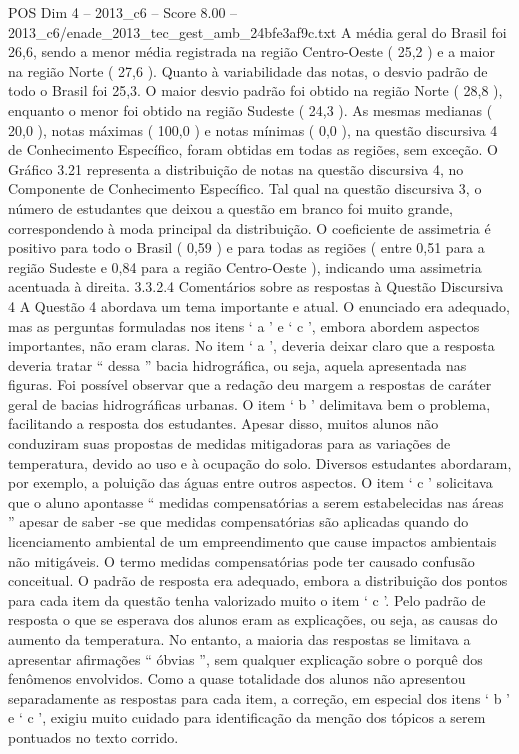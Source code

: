 \begin{textsample}{POS Dim 4 – 2013\_c6 – Score 8.00 – 2013\_c6/enade\_2013\_tec\_gest\_amb\_24bfe3af9c.txt}
A média geral do Brasil foi 26,6, sendo a menor média registrada na região Centro-Oeste ( 25,2 ) e a maior na região Norte ( 27,6 ).
Quanto à variabilidade das notas, o desvio padrão de todo o Brasil foi 25,3.
O maior desvio padrão foi obtido na região Norte ( 28,8 ), enquanto o menor foi obtido na região Sudeste ( 24,3 ).
As mesmas medianas ( 20,0 ), notas máximas ( 100,0 ) e notas mínimas ( 0,0 ), na questão discursiva 4 de Conhecimento Específico, foram obtidas em todas as regiões, sem exceção.
O Gráfico 3.21 representa a distribuição de notas na questão discursiva 4, no Componente de Conhecimento Específico.
Tal qual na questão discursiva 3, o número de estudantes que deixou a questão em branco foi muito grande, correspondendo à moda principal da distribuição.
O coeficiente de assimetria é positivo para todo o Brasil ( 0,59 ) e para todas as regiões ( entre 0,51 para a região Sudeste e 0,84 para a região Centro-Oeste ), indicando uma assimetria acentuada à direita. 3.3.2.4 Comentários sobre as respostas à Questão Discursiva 4 A Questão 4 abordava um tema importante e atual.
O enunciado era adequado, mas as perguntas formuladas nos itens ‘ a ’ e ‘ c ’, embora abordem aspectos importantes, não eram claras.
No item ‘ a ’, deveria deixar claro que a resposta deveria tratar “ dessa ” bacia hidrográfica, ou seja, aquela apresentada nas figuras.
Foi possível observar que a redação deu margem a respostas de caráter geral de bacias hidrográficas urbanas.
O item ‘ b ’ delimitava bem o problema, facilitando a resposta dos estudantes.
Apesar disso, muitos alunos não conduziram suas propostas de medidas mitigadoras para as variações de temperatura, devido ao uso e à ocupação do solo.
Diversos estudantes abordaram, por exemplo, a poluição das águas entre outros aspectos.
O item ‘ c ’ solicitava que o aluno apontasse “ medidas compensatórias a serem estabelecidas nas áreas ” apesar de saber -se que medidas compensatórias são aplicadas quando do licenciamento ambiental de um empreendimento que cause impactos ambientais não mitigáveis.
O termo medidas compensatórias pode ter causado confusão conceitual.
O padrão de resposta era adequado, embora a distribuição dos pontos para cada item da questão tenha valorizado muito o item ‘ c ’.
Pelo padrão de resposta o que se esperava dos alunos eram as explicações, ou seja, as causas do aumento da temperatura.
No entanto, a maioria das respostas se limitava a apresentar afirmações “ óbvias ”, sem qualquer explicação sobre o porquê dos fenômenos envolvidos.
Como a quase totalidade dos alunos não apresentou separadamente as respostas para cada item, a correção, em especial dos itens ‘ b ’ e ‘ c ’, exigiu muito cuidado para identificação da menção dos tópicos a serem pontuados no texto corrido.

\end{textsample}
